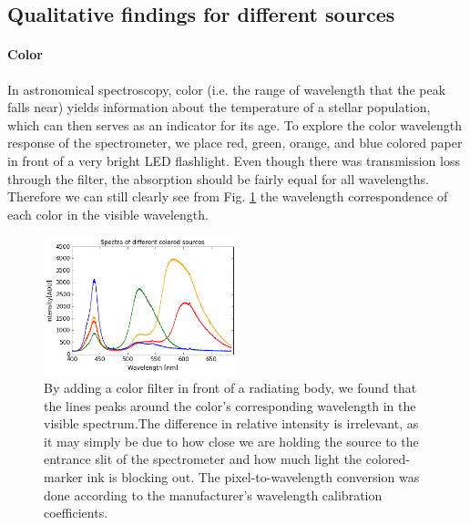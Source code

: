 \documentclass[authoryear, 12pt,5p, times]{elsarticle}
\begin{document}
	\subsection{Qualitative findings for different sources}
	\paragraph*{\textbf{Color}}
	
	 In astronomical spectroscopy, color (i.e. the range of wavelength that the peak falls near) yields information about the temperature of a stellar population, which can then serves as an indicator for its age. To explore the color wavelength response of the spectrometer, we place red, green, orange, and blue colored paper in front of a very bright LED flashlight. Even though there was transmission loss through the filter, the absorption should be fairly equal for all wavelengths. Therefore we can still clearly see from  Fig. \ref{color} the wavelength correspondence of each color  in the visible wavelength. 
	\begin{figure}[h!]
\includegraphics[width=0.5\textwidth]{figures/color}
\caption{ By adding a color filter in front of a radiating body, we found that the lines peaks around the color's corresponding wavelength in the visible spectrum.The difference in relative intensity is irrelevant, as it may simply be due to how close we are holding the source to the entrance slit of the spectrometer and how much light the colored-marker ink is blocking out. The pixel-to-wavelength conversion was done according to the manufacturer's wavelength calibration coefficients.}
\label{color}
\end{figure}
\end{document}
